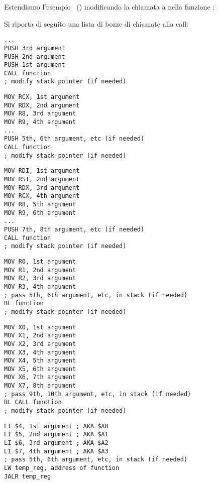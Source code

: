 \chapterold{\PrintfSeveralArgumentsSectionName}

Estendiamo l'esempio \IT{\HelloWorldSectionName}~() modificando la chiamata a  \printf nella funzione \main:







\sectionold{\Conclusion{}}

Si riporta di seguito una lista di bozze di chiamate alla call:

\begin{lstlisting}[caption=x86]
...
PUSH 3rd argument
PUSH 2nd argument
PUSH 1st argument
CALL function
; modify stack pointer (if needed)
\end{lstlisting}

\begin{lstlisting}[caption=x64 (MSVC)]
MOV RCX, 1st argument
MOV RDX, 2nd argument
MOV R8, 3rd argument
MOV R9, 4th argument
...
PUSH 5th, 6th argument, etc (if needed)
CALL function
; modify stack pointer (if needed)
\end{lstlisting}

\begin{lstlisting}[caption=x64 (GCC)]
MOV RDI, 1st argument
MOV RSI, 2nd argument
MOV RDX, 3rd argument
MOV RCX, 4th argument
MOV R8, 5th argument
MOV R9, 6th argument
...
PUSH 7th, 8th argument, etc (if needed)
CALL function
; modify stack pointer (if needed)
\end{lstlisting}

\begin{lstlisting}[caption=ARM]
MOV R0, 1st argument
MOV R1, 2nd argument
MOV R2, 3rd argument
MOV R3, 4th argument
; pass 5th, 6th argument, etc, in stack (if needed)
BL function
; modify stack pointer (if needed)
\end{lstlisting}

\begin{lstlisting}[caption=ARM64]
MOV X0, 1st argument
MOV X1, 2nd argument
MOV X2, 3rd argument
MOV X3, 4th argument
MOV X4, 5th argument
MOV X5, 6th argument
MOV X6, 7th argument
MOV X7, 8th argument
; pass 9th, 10th argument, etc, in stack (if needed)
BL CALL function
; modify stack pointer (if needed)
\end{lstlisting}

\begin{lstlisting}[caption=MIPS (O32 calling convention)]
LI $4, 1st argument ; AKA $A0
LI $5, 2nd argument ; AKA $A1
LI $6, 3rd argument ; AKA $A2
LI $7, 4th argument ; AKA $A3
; pass 5th, 6th argument, etc, in stack (if needed)
LW temp_reg, address of function
JALR temp_reg
\end{lstlisting}

